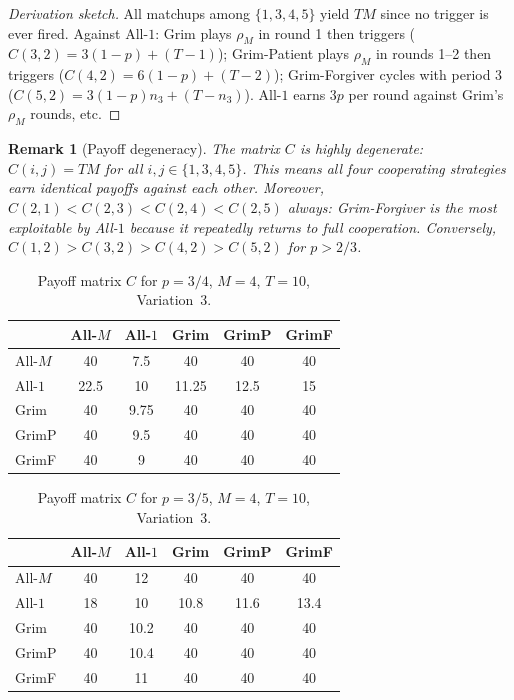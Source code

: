 \documentclass[12pt,a4paper]{article}
\newtheorem{remark}{Remark}[section]
\begin{document}
\begin{proof}[Derivation sketch]
All matchups among $\{1,3,4,5\}$ yield $TM$ since no trigger is ever fired.
Against All-$1$: Grim plays $\rho_M$ in round 1 then triggers ($C(3,2)=3(1-p)+(T-1)$);
Grim-Patient plays $\rho_M$ in rounds 1--2 then triggers ($C(4,2)=6(1-p)+(T-2)$);
Grim-Forgiver cycles with period 3 ($C(5,2)=3(1-p)n_3+(T-n_3)$). All-$1$ earns
$3p$ per round against Grim's $\rho_M$ rounds, etc.
\end{proof}

\begin{remark}[Payoff degeneracy]
The matrix $C$ is highly degenerate: $C(i,j)=TM$ for all $i,j\in\{1,3,4,5\}$.
This means all four cooperating strategies earn identical payoffs against each other.
Moreover, $C(2,1)<C(2,3)<C(2,4)<C(2,5)$ always: Grim-Forgiver is the most
exploitable by All-$1$ because it repeatedly returns to full cooperation.
Conversely, $C(1,2)>C(3,2)>C(4,2)>C(5,2)$ for $p>2/3$.
\end{remark}

\begin{table}[H]
\centering
\caption{Payoff matrix $C$ for $p=3/4$, $M=4$, $T=10$, Variation~3.}
\label{tab:v3_C_p075}
\renewcommand{\arraystretch}{1.25}
\begin{tabular}{lccccc}
\toprule
          & All-$M$ & All-$1$ & Grim   & GrimP  & GrimF  \\
\midrule
All-$M$   & 40      & 7.5     & 40     & 40     & 40     \\
All-$1$   & 22.5    & 10      & 11.25  & 12.5   & 15     \\
Grim      & 40      & 9.75    & 40     & 40     & 40     \\
GrimP     & 40      & 9.5     & 40     & 40     & 40     \\
GrimF     & 40      & 9       & 40     & 40     & 40     \\
\bottomrule
\end{tabular}
\end{table}

\begin{table}[H]
\centering
\caption{Payoff matrix $C$ for $p=3/5$, $M=4$, $T=10$, Variation~3.}
\label{tab:v3_C_p060}
\renewcommand{\arraystretch}{1.25}
\begin{tabular}{lccccc}
\toprule
          & All-$M$ & All-$1$ & Grim   & GrimP  & GrimF  \\
\midrule
All-$M$   & 40      & 12      & 40     & 40     & 40     \\
All-$1$   & 18      & 10      & 10.8   & 11.6   & 13.4   \\
Grim      & 40      & 10.2    & 40     & 40     & 40     \\
GrimP     & 40      & 10.4    & 40     & 40     & 40     \\
GrimF     & 40      & 11      & 40     & 40     & 40     \\
\bottomrule
\end{tabular}
\end{table}
\end{document}
